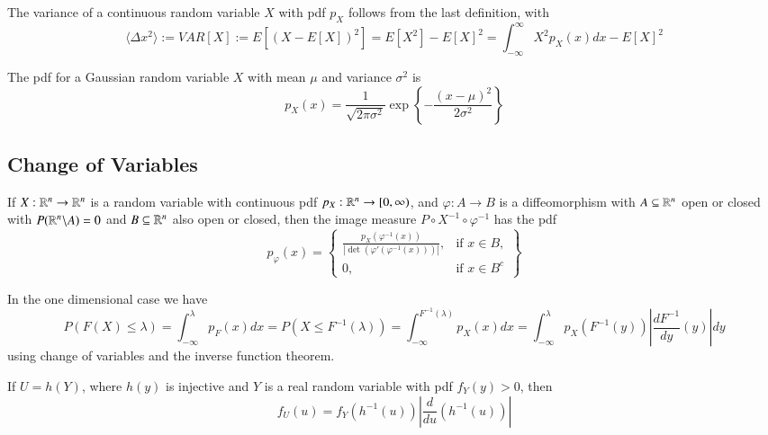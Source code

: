 \documentclass[12pt, a4paper, oneside, openright, titlepage]{book}
\begin{document}
\begin{defn}
    The variance of a continuous random variable $X$ with pdf $p_X$ follows from the last definition, with \begin{equation*}
        \langle \Delta x^2\rangle := VAR[X] := E[(X-E[X])^2] = E[X^2] - E[X]^2 = \int_{-\infty}^{\infty}X^2p_X(x)dx - E[X]^2
    \end{equation*}
\end{defn}

\begin{defn}
    The pdf for a Gaussian random variable $X$ with mean $\mu$ and variance $\sigma^2$ is \begin{equation*}
        p_X(x) = \frac{1}{\sqrt{2\pi\sigma^2}}\exp\left\{-\frac{(x-\mu)^2}{2\sigma^2}\right\}
    \end{equation*}
\end{defn}

\subsection{Change of Variables}

\begin{thm}
    If $X:\mathbb R^n\rightarrow \mathbb R^n$ is a random variable with continuous pdf $p_X:\mathbb R^n\rightarrow [0,\infty)$, and $\varphi:A\rightarrow B$ is a diffeomorphism with $A \subseteq \mathbb R^n$ open or closed with $P(\mathbb R^n\backslash A) = 0$ and $B \subseteq \mathbb R^n$ also open or closed, then the image measure $P\circ X^{-1} \circ \varphi^{-1}$ has the pdf \begin{equation*}
        p_{\varphi}(x) = \left\{\begin{array}{rc} \frac{p_X(\varphi^{-1}(x))}{\left|\det(\varphi'(\varphi^{-1}(x)))\right|}, & \text{if } x \in B, \\ 0, & \text{if } x \in B^c\end{array}\right\}
    \end{equation*}
\end{thm}
In the one dimensional case we have \begin{equation*}
    P(F(X) \leq \lambda) = \int_{-\infty}^{\lambda}p_F(x)dx = P(X\leq F^{-1}(\lambda)) = \int_{-\infty}^{F^{-1}(\lambda)}p_X(x)dx = \int_{-\infty}^{\lambda}p_X(F^{-1}(y))\left|\frac{dF^{-1}}{dy}(y)\right|dy
\end{equation*}
using change of variables and the inverse function theorem.

\begin{defn}
    If $U = h(Y)$, where $h(y)$ is injective and $Y$ is a real random variable with pdf $f_Y(y) > 0$, then $$f_U(u) = f_Y(h^{-1}(u))\left|\frac{d}{du}(h^{-1}(u))\right|$$
\end{defn}
\end{document}
